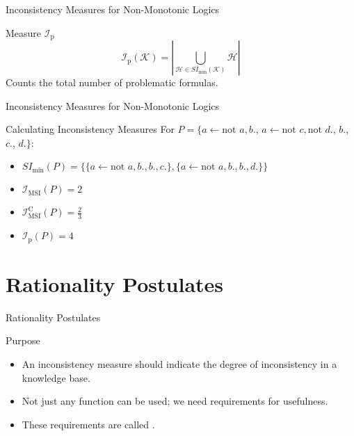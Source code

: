\begin{frame}{Inconsistency Measures for Non-Monotonic Logics}
    \begin{block}{Measure $\mathcal{I}_{\text{p}}$}
        \[
            \mathcal{I}_{\text{p}}(\mathcal{K}) = \left| \bigcup_{\mathcal{H} \in SI_{\min}(\mathcal{K})} \mathcal{H} \right|
        \]
        Counts the total number of problematic formulas.
    \end{block}
\end{frame}

\begin{frame}{Inconsistency Measures for Non-Monotonic Logics}
    \begin{exampleblock}{Calculating Inconsistency Measures}
        For $P = \{a \leftarrow \text{not } a, b.$, $a \leftarrow \text{not } c, \text{not } d.$, $b.$, $c.$, $d.\}$:

        \begin{itemize}
            \item $SI_{\min}(P) = \{\{a \leftarrow \text{not } a, b., b., c.\}, \{a \leftarrow \text{not } a, b., b., d.\}\}$
            \item $\mathcal{I}_{\text{MSI}}(P) = 2$
            \item $\mathcal{I}_{\text{MSI}}^\text{C}(P) = \frac{2}{3}$
            \item $\mathcal{I}_{\text{p}}(P) = 4$
        \end{itemize}
    \end{exampleblock}
\end{frame}
\section{Rationality Postulates}

\begin{frame}{Rationality Postulates}
    \begin{block}{Purpose}
        \begin{itemize}
            \item An inconsistency measure should indicate the degree of inconsistency in a knowledge base.
            \item Not just any function can be used; we need requirements for usefulness.
            \item These requirements are called .
        \end{itemize}
    \end{block}
\end{frame}

